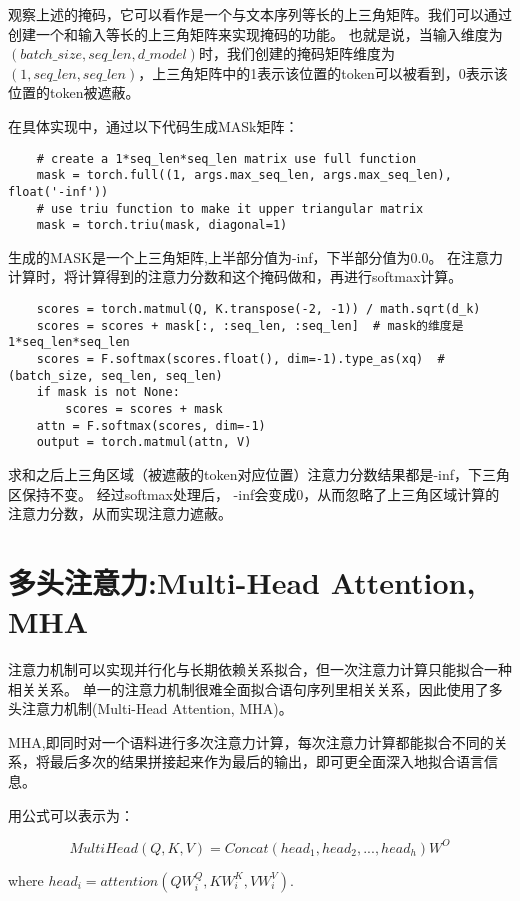 \documentclass{article}
\begin{document}
观察上述的掩码，它可以看作是一个与文本序列等长的上三角矩阵。我们可以通过创建一个和输入等长的上三角矩阵来实现掩码的功能。
也就是说，当输入维度为 $(batch\_size, seq\_len, d\_model)$时，我们创建的掩码矩阵维度为 $(1, seq\_len, seq\_len)$，上三角矩阵中的1表示该位置的token可以被看到，0表示该位置的token被遮蔽。

在具体实现中，通过以下代码生成MASk矩阵：
\begin{verbatim}
    # create a 1*seq_len*seq_len matrix use full function
    mask = torch.full((1, args.max_seq_len, args.max_seq_len), float('-inf'))
    # use triu function to make it upper triangular matrix
    mask = torch.triu(mask, diagonal=1)
\end{verbatim}

生成的MASK是一个上三角矩阵,上半部分值为-inf，下半部分值为0.0。
在注意力计算时，将计算得到的注意力分数和这个掩码做和，再进行softmax计算。
\begin{verbatim}
    scores = torch.matmul(Q, K.transpose(-2, -1)) / math.sqrt(d_k)
    scores = scores + mask[:, :seq_len, :seq_len]  # mask的维度是1*seq_len*seq_len
    scores = F.softmax(scores.float(), dim=-1).type_as(xq)  # (batch_size, seq_len, seq_len)
    if mask is not None:
        scores = scores + mask
    attn = F.softmax(scores, dim=-1)
    output = torch.matmul(attn, V)
\end{verbatim}

求和之后上三角区域（被遮蔽的token对应位置）注意力分数结果都是-inf，下三角区保持不变。
经过softmax处理后， -inf会变成0，从而忽略了上三角区域计算的注意力分数，从而实现注意力遮蔽。


\section{多头注意力:Multi-Head Attention, MHA}
注意力机制可以实现并行化与长期依赖关系拟合，但一次注意力计算只能拟合一种相关关系。
单一的注意力机制很难全面拟合语句序列里相关关系，因此使用了多头注意力机制(Multi-Head Attention, MHA)。

MHA,即同时对一个语料进行多次注意力计算，每次注意力计算都能拟合不同的关系，将最后多次的结果拼接起来作为最后的输出，即可更全面深入地拟合语言信息。

用公式可以表示为：

\begin{equation}
    MultiHead(Q,K,V) = Concat(head_1, head_2, ..., head_h)W^O
    \label{eq:mha}
\end{equation}
 
where $head_i = attention(QW_i^Q, KW_i^K, VW_i^V)$.
\end{document}

